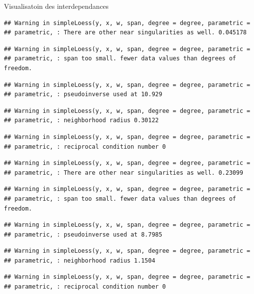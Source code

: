 \documentclass[11pt,ignorenonframetext,]{beamer}
\begin{document}
\begin{frame}[fragile]{Visualisatoin des interdependances}
\begin{verbatim}
## Warning in simpleLoess(y, x, w, span, degree = degree, parametric =
## parametric, : There are other near singularities as well. 0.045178
\end{verbatim}

\begin{verbatim}
## Warning in simpleLoess(y, x, w, span, degree = degree, parametric =
## parametric, : span too small. fewer data values than degrees of freedom.
\end{verbatim}

\begin{verbatim}
## Warning in simpleLoess(y, x, w, span, degree = degree, parametric =
## parametric, : pseudoinverse used at 10.929
\end{verbatim}

\begin{verbatim}
## Warning in simpleLoess(y, x, w, span, degree = degree, parametric =
## parametric, : neighborhood radius 0.30122
\end{verbatim}

\begin{verbatim}
## Warning in simpleLoess(y, x, w, span, degree = degree, parametric =
## parametric, : reciprocal condition number 0
\end{verbatim}

\begin{verbatim}
## Warning in simpleLoess(y, x, w, span, degree = degree, parametric =
## parametric, : There are other near singularities as well. 0.23099
\end{verbatim}

\begin{verbatim}
## Warning in simpleLoess(y, x, w, span, degree = degree, parametric =
## parametric, : span too small. fewer data values than degrees of freedom.
\end{verbatim}

\begin{verbatim}
## Warning in simpleLoess(y, x, w, span, degree = degree, parametric =
## parametric, : pseudoinverse used at 8.7985
\end{verbatim}

\begin{verbatim}
## Warning in simpleLoess(y, x, w, span, degree = degree, parametric =
## parametric, : neighborhood radius 1.1504
\end{verbatim}

\begin{verbatim}
## Warning in simpleLoess(y, x, w, span, degree = degree, parametric =
## parametric, : reciprocal condition number 0
\end{verbatim}


\end{frame}
\end{document}
